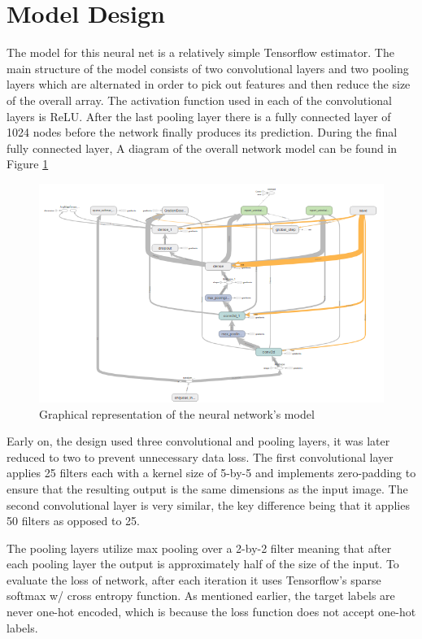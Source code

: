 \documentclass{article}
\begin{document}
	\section{Model Design}
	\label{model}
	
	The model for this neural net is a relatively simple Tensorflow estimator.  The main structure of the model consists of two convolutional layers and two pooling layers which are alternated in order to pick out features and then reduce the size of the overall array.  The activation function used in each of the convolutional layers is ReLU.  After the last pooling layer there is a fully connected layer of 1024 nodes before the network finally produces its prediction.  During the final fully connected layer, A diagram of the overall network model can be found in Figure \ref{fig:model}
	
	\begin{figure}
		\centering
		\includegraphics[width=0.7\linewidth]{Model.png}
		\captionsetup{width=0.7\linewidth}
		\caption{Graphical representation of the neural network's model}
		\label{fig:model}
	\end{figure}

	
	
	Early on, the design used three convolutional and pooling layers, it was later reduced to two to prevent unnecessary data loss. The first convolutional layer applies 25 filters each with a kernel size of 5-by-5 and implements zero-padding to ensure that the resulting output is the same dimensions as the input image. The second convolutional layer is very similar, the key difference being that it applies 50 filters as opposed to 25.
	
	The pooling layers utilize max pooling over a 2-by-2 filter meaning that after each pooling layer the output is approximately half of the size of the input. To evaluate the loss of network, after each iteration it uses Tensorflow's sparse softmax w/ cross entropy function. As mentioned earlier, the target labels are never one-hot encoded, which is because the loss function does not accept one-hot labels.
	
\end{document}

